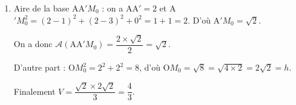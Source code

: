 \documentclass[10pt]{article}
\providecommand{\vect}[1]{\overrightarrow{#1}}
\begin{document}
\begin{enumerate}
Donc le vecteur $\vect{u}$ est orthogonal à deux vecteurs non colinéaires du plan $\left(\text{AA}'M_0\right)$,donc la droite $(d)$ est orthogonale au plan 
$\left(\text{AA}'M_0\right)$. Le point $M_0$ est donc le projeté orthogonal de O sur le plan $\left(\text{AA}'M_0\right)$, donc O$M_0$ est la distance la plus courte du point O au plan $\left(\text{AA}'M_0\right)$.

\item 




Aire de la base AA$'M_0$ : on a AA$' = 2$ et A$'M_0^2 = (2 - 1)^2 + (2 - 3)^2 + 0^2 = 1 + 1 = 2$. D'où A$'M_0 = \sqrt{2}$.

On a donc $\mathcal{A}\left(\text{AA}'M_0\right) = \dfrac{2 \times \sqrt{2}}{2} = \sqrt{2}$.

D'autre part : O$M_0^2 = 2^2 + 2^2 = 8$, d'où O$M_0 = \sqrt{8} = \sqrt{4 \times 2} = 2\sqrt{2} = h$.

Finalement $V  = \dfrac{\sqrt{2} \times 2\sqrt{2}}{3} = \dfrac{4}{3}$.
\end{enumerate}

\vspace{0.75cm}
\end{document}
